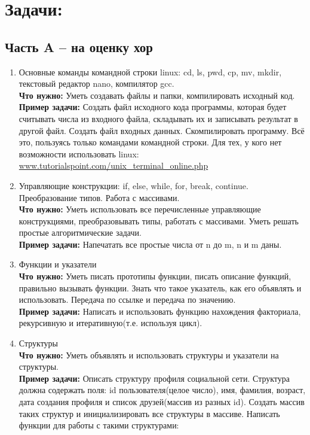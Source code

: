 \documentclass{article}
\begin{document}

\section*{Задачи:}
\subsection*{Часть A -- на оценку хор}

\begin{enumerate}
\item Основные команды командной строки linux: cd, ls, pwd, cp, mv, mkdir, текстовый редактор nano, компилятор gcc. \\
\textbf{Что нужно:} Уметь создавать файлы и папки, компилировать исходный код. \\
\textbf{Пример задачи:} Создать файл исходного кода программы, которая будет считывать числа из входного файла, складывать их и записывать результат в другой файл. Создать файл входных данных. Скомпилировать программу. Всё это, пользуясь только командами командной строки. Для тех, у кого нет возможности использовать linux:\\
\href{https://www.tutorialspoint.com/unix_terminal_online.php}{www.tutorialspoint.com/unix\_terminal\_online.php}
\item Управляющие конструкции: if, else, while, for, break, continue. Преобразование типов. Работа с массивами. \\
\textbf{Что нужно:} Уметь использовать все перечисленные управляющие конструкциями, преобразовывать типы, работать с массивами. Уметь решать простые алгоритмические задачи. \\
\textbf{Пример задачи:} Напечатать все простые числа от n до m, n и m даны.
\item Функции и указатели \\
\textbf{Что нужно:} Уметь писать прототипы функции, писать описание функций, правильно вызывать функции. Знать что такое указатель, как его объявлять и использовать. Передача по ссылке и передача по значению.\\
\textbf{Пример задачи:} Написать и использовать функцию нахождения факториала, рекурсивную и итеративную(т.е. используя цикл).
\item Структуры \\
\textbf{Что нужно:} Уметь объявлять и использовать структуры и указатели на структуры.\\
\textbf{Пример задачи:} Описать структуру профиля социальной сети. Структура должна содержать поля: id пользователя(целое число), имя, фамилия, возраст, дата создания профиля и список друзей(массив из разных id). Создать массив таких структур и инициализировать все структуры в массиве. Написать функции для работы с такими структурами:

\end{enumerate}
\end{document}
